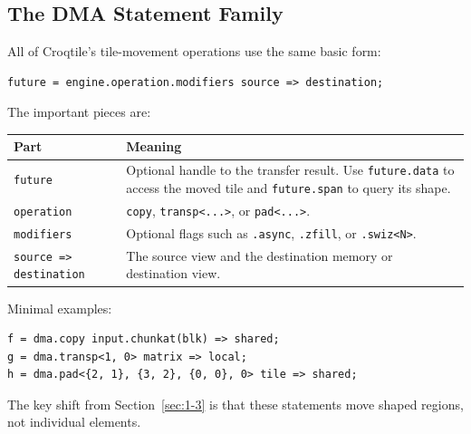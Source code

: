\subsection*{The DMA Statement Family}

All of Croqtile's tile-movement operations use the same basic form:

\begin{lstlisting}[language=croqtile,caption={The general DMA form}]
future = engine.operation.modifiers source => destination;
\end{lstlisting}

The important pieces are:

\begin{table}[htbp]
\centering\small
\begin{tabularx}{\linewidth}{@{}lX@{}}
\toprule
\textbf{Part} & \textbf{Meaning} \\
\midrule
\texttt{future} & Optional handle to the transfer result. Use \texttt{future.data} to access the moved tile and \texttt{future.span} to query its shape. \\
\texttt{operation} & \texttt{copy}, \texttt{transp\textless{}.\allowbreak{}.\allowbreak{}.\allowbreak{}\textgreater{}}, or \texttt{pad\textless{}.\allowbreak{}.\allowbreak{}.\allowbreak{}\textgreater{}}. \\
\texttt{modifiers} & Optional flags such as \texttt{.async}, \texttt{.zfill}, or \texttt{.\allowbreak{}swiz\textless{}N\textgreater{}}. \\
\texttt{source =\textgreater{} destination} & The source view and the destination memory or destination view. \\
\bottomrule
\end{tabularx}
\end{table}

Minimal examples:

\begin{lstlisting}[language=croqtile,caption={A concrete copy}]
f = dma.copy input.chunkat(blk) => shared;
g = dma.transp<1, 0> matrix => local;
h = dma.pad<{2, 1}, {3, 2}, {0, 0}, 0> tile => shared;
\end{lstlisting}

The key shift from Section~\ref{sec:1-3} is that these statements move shaped regions, not individual elements.
